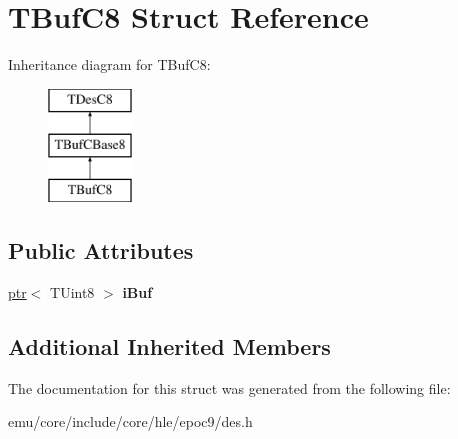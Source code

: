 \hypertarget{struct_t_buf_c8}{}\section{T\+Buf\+C8 Struct Reference}
\label{struct_t_buf_c8}
Inheritance diagram for T\+Buf\+C8\+:\begin{figure}[H]
\begin{center}
\leavevmode
\includegraphics[height=3.000000cm]{struct_t_buf_c8}
\end{center}
\end{figure}
\subsection*{Public Attributes}
\begin{DoxyCompactItemize}
\item 
\mbox{\label{struct_t_buf_c8_a8631a57b9df585e2816dd509e9e7d826}} 
\mbox{\hyperlink{classeka2l1_1_1ptr}{ptr}}$<$ T\+Uint8 $>$ {\bfseries i\+Buf}
\end{DoxyCompactItemize}
\subsection*{Additional Inherited Members}


The documentation for this struct was generated from the following file\+:\begin{DoxyCompactItemize}
\item 
emu/core/include/core/hle/epoc9/des.\+h\end{DoxyCompactItemize}
